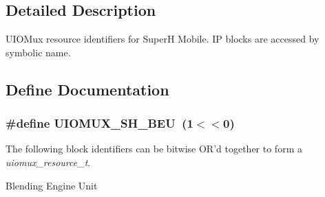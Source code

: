\subsection{Detailed Description}
UIOMux resource identifiers for SuperH Mobile. IP blocks are accessed by symbolic name. 

\subsection{Define Documentation}
\subsubsection[{UIOMUX\_\-SH\_\-BEU}]{\setlength{\rightskip}{0pt plus 5cm}\#define UIOMUX\_\-SH\_\-BEU~(1$<$$<$0)}\label{arch__sh_8h_aa675bc29d53cce04fa0679740058e527}


The following block identifiers can be bitwise OR'd together to form a {\itshape uiomux\_\-resource\_\-t\/}. 

Blending Engine Unit 